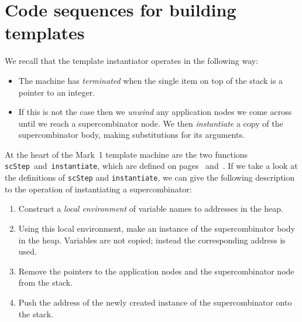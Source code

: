 \section{Code sequences for building templates}
\label{background-gm}

We recall that the template instantiator operates in the following
way:
\begin{itemize}

\item The machine has {\em terminated\/} when the single item on top of the stack is a pointer to an
integer.

\item If this is not the case then we {\em unwind\/} any application nodes we come across until we reach a
supercombinator node. We then {\em instantiate\/} a copy of the supercombinator body, making substitutions
for its arguments.

\end{itemize}

At the heart of the Mark~1 template machine are the two functions
\mbox{\tt scStep}~and~\mbox{\tt instantiate}, which are defined on pages
\pageref{page:sc-step}~and~\pageref{page:instantiate}. If we take a
look at the definitions of \mbox{\tt scStep} and \mbox{\tt instantiate}, we can give the
following description to the operation of instantiating a
supercombinator:

\begin{enumerate}

\item Construct a {\em local environment\/} of variable names to addresses in the heap.

\item Using this local environment, make an instance of the
supercombinator body in the heap.  Variables are not copied; instead
the corresponding address is used.

\item Remove the pointers to the application nodes and the
supercombinator node from the stack.

\item Push the address of the newly created instance of the
supercombinator onto the stack.

\end{enumerate}

